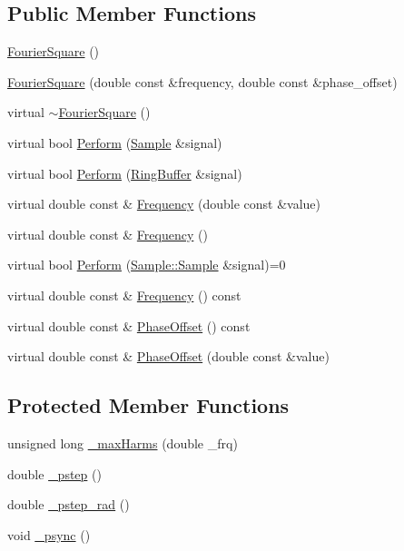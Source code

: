 \subsection*{Public Member Functions}
\begin{DoxyCompactItemize}
\item 
\hyperlink{classDSG_1_1FourierSquare_ac73c7436f0d4b9a9b5d8270d5c8d23ac}{Fourier\+Square} ()
\item 
\hyperlink{classDSG_1_1FourierSquare_ad7cfa0d909e1c7e7d0709e03d0381c3d}{Fourier\+Square} (double const \&frequency, double const \&phase\+\_\+offset)
\item 
virtual \hyperlink{classDSG_1_1FourierSquare_a9a10acb7bddbb26000d806292d78a394}{$\sim$\+Fourier\+Square} ()
\item 
virtual bool \hyperlink{classDSG_1_1FourierSquare_a3e9cfc95b3592eaf04fbcd61a3c68387}{Perform} (\hyperlink{classDSG_1_1Sample}{Sample} \&signal)
\item 
virtual bool \hyperlink{classDSG_1_1FourierSquare_ad9999119d9efc453329ed4b3eaf5f226}{Perform} (\hyperlink{classDSG_1_1RingBuffer}{Ring\+Buffer} \&signal)
\item 
virtual double const \& \hyperlink{classDSG_1_1FourierSquare_a80f94eabad633e105cfa673fdee332d6}{Frequency} (double const \&value)
\item 
virtual double const \& \hyperlink{classDSG_1_1FourierSquare_aa534934e73f4a057005fff6843e3e611}{Frequency} ()
\item 
virtual bool \hyperlink{classDSG_1_1SignalProcess_afdb8220100418893950c1161dd24db67}{Perform} (\hyperlink{classDSG_1_1Sample_aaf2e30d73911eccea99b53eeee15b612}{Sample\+::\+Sample} \&signal)=0
\item 
virtual double const \& \hyperlink{classDSG_1_1SignalGenerator_aedac746c5a70818d120858542ecb7c45}{Frequency} () const 
\item 
virtual double const \& \hyperlink{classDSG_1_1SignalGenerator_a1ce521847edd0b837fd840998f906b4b}{Phase\+Offset} () const 
\item 
virtual double const \& \hyperlink{classDSG_1_1SignalGenerator_a08b71b1f30ba65e629642c570291dc0e}{Phase\+Offset} (double const \&value)
\end{DoxyCompactItemize}
\subsection*{Protected Member Functions}
\begin{DoxyCompactItemize}
\item 
unsigned long \hyperlink{classDSG_1_1FourierGenerator_a6b6e3bbad8ff7443d9ed71f4cdf76739}{\+\_\+max\+Harms} (double \+\_\+frq)
\item 
double \hyperlink{classDSG_1_1SignalGenerator_ac0d781b8673b3a283bf7c133290ede50}{\+\_\+pstep} ()
\item 
double \hyperlink{classDSG_1_1SignalGenerator_ae660eb4caa88b8d278f8d24d0908a487}{\+\_\+pstep\+\_\+rad} ()
\item 
void \hyperlink{classDSG_1_1SignalGenerator_a05baccb38d1e52860d4fcf7cb8430efc}{\+\_\+psync} ()
\end{DoxyCompactItemize}

